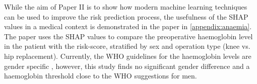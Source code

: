While the aim of Paper II is to show how modern machine learning techniques can be used to improve the risk prediction process, the usefulness of the SHAP values in a medical context is demonstrated in the paper in \autoref{appendix:anaemia}. The paper uses the SHAP values to compare the preoperative haemoglobin level in the patient with the risk-score, stratified by sex and operation type (knee vs. hip replacement). Currently, the WHO guidelines for the haemoglobin levels are gender specific \autocite{anaemiasNutritionalAnaemiasReport1968}, however, this study finds no significant gender difference and a haemoglobin threshold close to the WHO suggestions for men.